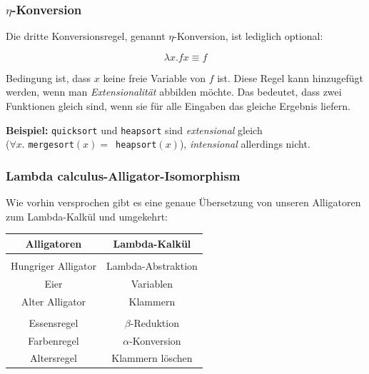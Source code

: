 \documentclass{beamer}
\begin{document}

\begin{frame}
\frametitle{$\eta$-Konversion}

Die dritte Konversionsregel, genannt $\eta$-Konversion, ist lediglich optional:

$$ \lambda x . f x \equiv f$$
\pause

Bedingung ist, dass $x$ keine freie Variable von $f$ ist. Diese Regel kann hinzugefügt werden, wenn man \emph{Extensionalität} abbilden möchte. Das bedeutet, dass zwei Funktionen gleich sind, wenn sie für alle Eingaben das gleiche Ergebnis liefern.\pause\bigskip

\textbf{Beispiel:} \texttt{quicksort} und \texttt{heapsort} sind \emph{extensional} gleich
\\($\forall x . $ \texttt{mergesort}$(x) = $\texttt{ heapsort}$(x) $), \emph{intensional} allerdings nicht.
\end{frame}


\begin{frame}
\frametitle{Lambda calculus-Alligator-Isomorphism}

Wie vorhin versprochen gibt es eine genaue Übersetzung von unseren Alligatoren zum
Lambda-Kalkül und umgekehrt:\pause\bigskip

\begin{center}
\begin{tabular}{c|c}
\textbf{Alligatoren} & \textbf{Lambda-Kalkül}\\
\hline
\\
Hungriger Alligator & Lambda-Abstraktion\\
Eier & Variablen\\
Alter Alligator & Klammern\\
&\\
Essensregel & $\beta$-Reduktion\\
Farbenregel & $\alpha$-Konversion\\
Altersregel & Klammern löschen\\ 

\end{tabular}
\end{center}

\end{frame}

\end{document}
